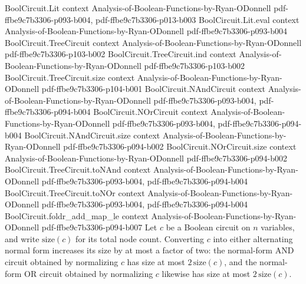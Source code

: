 \begin{theorem}
\label{BoolCircuit.toNAnd_toNOr_size_le}
\leanok
{}
\proofstep
  {BoolCircuit.Lit}
  {context}
  {Analysis-of-Boolean-Functions-by-Ryan-ODonnell}
  {pdf-ffbe9c7b3306-p093-b004,
    pdf-ffbe9c7b3306-p013-b003}
\proofstep
  {BoolCircuit.Lit.eval}
  {context}
  {Analysis-of-Boolean-Functions-by-Ryan-ODonnell}
  {pdf-ffbe9c7b3306-p093-b004}
\proofstep
  {BoolCircuit.TreeCircuit}
  {context}
  {Analysis-of-Boolean-Functions-by-Ryan-ODonnell}
  {pdf-ffbe9c7b3306-p103-b002}
\proofstep
  {BoolCircuit.TreeCircuit.ind}
  {context}
  {Analysis-of-Boolean-Functions-by-Ryan-ODonnell}
  {pdf-ffbe9c7b3306-p103-b002}
\proofstep
  {BoolCircuit.TreeCircuit.size}
  {context}
  {Analysis-of-Boolean-Functions-by-Ryan-ODonnell}
  {pdf-ffbe9c7b3306-p104-b001}
\proofstep
  {BoolCircuit.NAndCircuit}
  {context}
  {Analysis-of-Boolean-Functions-by-Ryan-ODonnell}
  {pdf-ffbe9c7b3306-p093-b004,
    pdf-ffbe9c7b3306-p094-b004}
\proofstep
  {BoolCircuit.NOrCircuit}
  {context}
  {Analysis-of-Boolean-Functions-by-Ryan-ODonnell}
  {pdf-ffbe9c7b3306-p093-b004,
    pdf-ffbe9c7b3306-p094-b004}
\proofstep
  {BoolCircuit.NAndCircuit.size}
  {context}
  {Analysis-of-Boolean-Functions-by-Ryan-ODonnell}
  {pdf-ffbe9c7b3306-p094-b002}
\proofstep
  {BoolCircuit.NOrCircuit.size}
  {context}
  {Analysis-of-Boolean-Functions-by-Ryan-ODonnell}
  {pdf-ffbe9c7b3306-p094-b002}
\proofstep
  {BoolCircuit.TreeCircuit.toNAnd}
  {context}
  {Analysis-of-Boolean-Functions-by-Ryan-ODonnell}
  {pdf-ffbe9c7b3306-p093-b004,
    pdf-ffbe9c7b3306-p094-b004}
\proofstep
  {BoolCircuit.TreeCircuit.toNOr}
  {context}
  {Analysis-of-Boolean-Functions-by-Ryan-ODonnell}
  {pdf-ffbe9c7b3306-p093-b004,
    pdf-ffbe9c7b3306-p094-b004}
\proofstep
  {BoolCircuit.foldr_add_map_le}
  {context}
  {Analysis-of-Boolean-Functions-by-Ryan-ODonnell}
  {pdf-ffbe9c7b3306-p094-b007}
Let $c$ be a Boolean circuit on $n$ variables, and write $\mathrm{size}(c)$ for its
total node count. Converting $c$ into either alternating normal form increases its size
by at most a factor of two: the normal-form AND circuit obtained by normalizing $c$ has
size at most $2\,\mathrm{size}(c)$, and the normal-form OR circuit obtained by
normalizing $c$ likewise has size at most $2\,\mathrm{size}(c)$.
\end{theorem}


